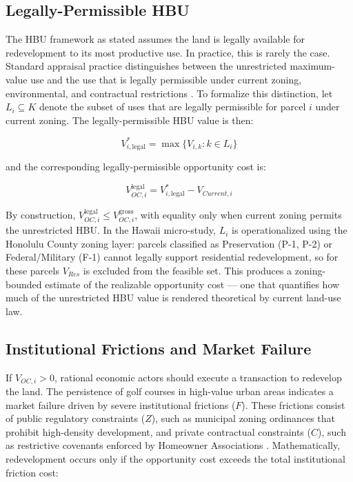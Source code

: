 \documentclass[11pt, letterpaper]{article}
\begin{document}
\subsection{Legally-Permissible HBU}

The HBU framework as stated assumes the land is legally available for redevelopment to its most productive use. In practice, this is rarely the case. Standard appraisal practice distinguishes between the unrestricted maximum-value use and the use that is legally permissible under current zoning, environmental, and contractual restrictions \parencite{AppraisalInstitute2020}. To formalize this distinction, let $L_i \subseteq K$ denote the subset of uses that are legally permissible for parcel $i$ under current zoning. The legally-permissible HBU value is then:

\begin{equation}
    V_{i, \text{legal}}^* = \max\{V_{i,k} : k \in L_i\}
\end{equation}

\noindent and the corresponding legally-permissible opportunity cost is:

\begin{equation}
    V_{OC, i}^{\text{legal}} = V_{i, \text{legal}}^* - V_{Current, i}
\end{equation}

By construction, $V_{OC, i}^{\text{legal}} \leq V_{OC, i}^{\text{gross}}$, with equality only when current zoning permits the unrestricted HBU. In the Hawaii micro-study, $L_i$ is operationalized using the Honolulu County zoning layer: parcels classified as Preservation (P-1, P-2) or Federal/Military (F-1) cannot legally support residential redevelopment, so for these parcels $V_{Res}$ is excluded from the feasible set. This produces a zoning-bounded estimate of the realizable opportunity cost --- one that quantifies how much of the unrestricted HBU value is rendered theoretical by current land-use law.

\subsection{Institutional Frictions and Market Failure}

If $V_{OC, i} > 0$, rational economic actors should execute a transaction to redevelop the land. The persistence of golf courses in high-value urban areas indicates a market failure driven by severe institutional frictions ($F$). These frictions consist of public regulatory constraints ($Z$), such as municipal zoning ordinances that prohibit high-density development, and private contractual constraints ($C$), such as restrictive covenants enforced by Homeowner Associations \parencite{Ellickson2022, Korngold2024}. Mathematically, redevelopment occurs only if the opportunity cost exceeds the total institutional friction cost:
\end{document}
